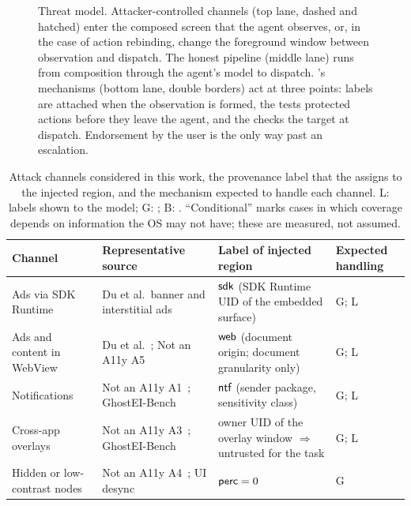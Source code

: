 \begin{figure}[t]
  \centering
  
  \caption{Threat model. Attacker-controlled channels (top lane, dashed and hatched) enter the composed screen that the agent observes, or, in the case of action rebinding, change the foreground window between observation and dispatch. The honest pipeline (middle lane) runs from composition through the agent's model to dispatch. \PG{}'s mechanisms (bottom lane, double borders) act at three points: labels are attached when the observation is formed, the \CG{} tests protected actions before they leave the agent, and the \DB{} checks the target at dispatch. Endorsement by the user is the only way past an escalation.}
  \label{fig:threat}
\end{figure}

\begin{table}[t]
\centering
\caption{Attack channels considered in this work, the provenance label that the \LS{} assigns to the injected region, and the mechanism expected to handle each channel. L: labels shown to the model; G: \CG{}; B: \DB{}. ``Conditional'' marks cases in which coverage depends on information the OS may not have; these are measured, not assumed.}
\label{tab:channels}
\footnotesize
\setlength{\tabcolsep}{3pt}
\begin{tabularx}{\textwidth}{@{}>{\raggedright\arraybackslash}p{3.2cm} >{\raggedright\arraybackslash}X >{\raggedright\arraybackslash}p{2.6cm} >{\raggedright\arraybackslash}p{2.6cm}@{}}
\toprule
Channel & Representative source & Label of injected region & Expected handling \\
\midrule
Ads via SDK Runtime & Du et al.\ banner and interstitial ads~\cite{du2025measuringmobileagents} & $\textsf{sdk}$ (SDK Runtime UID of the embedded surface) & G; L \\
Ads and content in WebView & Du et al.~\cite{du2025measuringmobileagents}; Not an A11y A5~\cite{deivasigamani2026nota11y} & $\textsf{web}$ (document origin; document granularity only) & G; L \\
Notifications & Not an A11y A1~\cite{deivasigamani2026nota11y}; GhostEI-Bench~\cite{chen2025ghosteibench} & $\textsf{ntf}$ (sender package, sensitivity class) & G; L \\
Cross-app overlays & Not an A11y A3~\cite{deivasigamani2026nota11y}; GhostEI-Bench~\cite{chen2025ghosteibench} & owner UID of the overlay window $\Rightarrow$ untrusted for the task & G; L \\
Hidden or low-contrast nodes & Not an A11y A4~\cite{deivasigamani2026nota11y}; UI desync~\cite{li2026uidesync} & $\mathsf{perc}=0$ & G \\

\end{tabularx}
\end{table}
